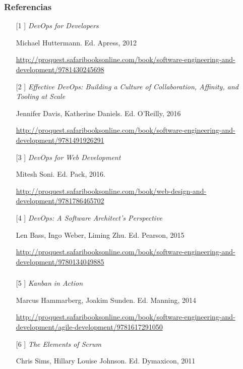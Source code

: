 \documentclass[ucs]{beamer}
\begin{document}
\begin{frame}[fragile]
\frametitle{Referencias}
\begin{itemize}
\item[[1]]
\emph{DevOps for Developers}

Michael Huttermann. Ed. Apress, 2012

\begin{tiny}
\url{http://proquest.safaribooksonline.com/book/software-engineering-and-development/9781430245698}
\end{tiny}

\item[[2]]
\emph{Effective DevOps: Building a Culture of Collaboration, Affinity, and Tooling at Scale}

Jennifer Davis, Katherine Daniels. Ed. O'Reilly, 2016

\begin{tiny}
\url{http://proquest.safaribooksonline.com/book/software-engineering-and-development/9781491926291}
\end{tiny}

\item[[3]]
\emph{DevOps for Web Development}

Mitesh Soni.
Ed. Pack, 2016.

\begin{tiny}
\url{http://proquest.safaribooksonline.com/book/web-design-and-development/9781786465702}
\end{tiny}


\item[[4]]
\emph{DevOps: A Software Architect's Perspective}

Len Bass, Ingo Weber, Liming Zhu.
Ed. Pearson, 2015

\begin{tiny}
\url{http://proquest.safaribooksonline.com/book/software-engineering-and-development/9780134049885}
\end{tiny}
\end{itemize}
\end{frame}


\begin{frame}[fragile]
\frametitle{}
\begin{itemize}
\item[[5]]
\emph{Kanban in Action}

Marcus Hammarberg, Joakim Sunden. Ed. Manning, 2014

\begin{tiny}
\url{http://proquest.safaribooksonline.com/book/software-engineering-and-development/agile-development/9781617291050}
\end{tiny}

\item[[6]]
\emph{The Elements of Scrum}

Chris Sims, Hillary Louise Johnson. Ed. Dymaxicon, 2011
\end{itemize}

\end{frame}
\end{document}
